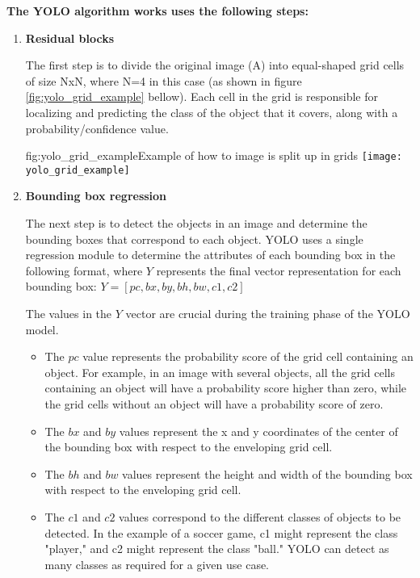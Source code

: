         \textbf{The YOLO algorithm works uses the following steps:}
        \begin{enumerate}

            \item \textbf{Residual blocks}
        
            The first step is to divide the original image (A) into equal-shaped grid cells of size NxN, where N=4 in this case (as shown in figure \ref{fig:yolo_grid_example} bellow). 
            Each cell in the grid is responsible for localizing and predicting the class of the object that it covers, along with a probability/confidence value.

            \begin{linfigure}{fig:yolo_grid_example}{Example of how to image is split up in grids}
                \texttt{[image: yolo\_grid\_example]}
            \end{linfigure}
            
            \item \textbf{Bounding box regression}
        
            The next step is to detect the objects in an image and determine the bounding boxes that correspond to each object. 
            YOLO uses a single regression module to determine the attributes of each bounding box in the following format, where \(Y\) represents the final vector representation for each bounding box: \(Y = [pc, bx, by, bh, bw, c1, c2]\)
        
            The values in the \(Y\) vector are crucial during the training phase of the YOLO model.

            \begin{itemize}
            \item The \(pc\) value represents the probability score of the grid cell containing an object. For example, in an image with several objects, all the grid cells containing an object will have a probability score higher than zero, while the grid cells without an object will have a probability score of zero.
            \item The \(bx\) and \(by\) values represent the x and y coordinates of the center of the bounding box with respect to the enveloping grid cell.
            \item The \(bh\) and \(bw\) values represent the height and width of the bounding box with respect to the enveloping grid cell.
            \item The \(c1\) and \(c2\) values correspond to the different classes of objects to be detected. In the example of a soccer game, c1 might represent the class "player," and c2 might represent the class "ball." YOLO can detect as many classes as required for a given use case.
            \end{itemize}


\end{enumerate}
